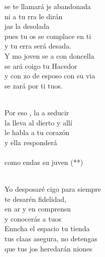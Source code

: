 \begin{cancion}%
	 se te llamará js abandonada \\
	ni a tu rra le dirán \\
	jas la desolada \\
	pues tu os se complace en ti \\
	y tu erra será desada.\\
	Y mo joven se a con doncella\\
	se ará coigo tu Hacedor\\
	y con zo de esposo con su via\\
	se zará por ti tuos. \\\jump\\
	\begin{chorus}%
	Por eso , la  a seducir\\
	la lleva al dierto y allí\\
	le habla a tu corazón \\
	y ella  responderá\\
{}\vspace*{-0.4cm}\\
	como endas  su juven (**)\\
	\end{chorus}%
	\jump\\
	Yo  desposaré cigo para siempre\\
	te desarén fidelidad,\\
	en ar y en comprensn \\
	y  conocerás a tuos\\
	Enncha el espacio tu tienda\\
	tus claas asegura, no  detengas\\
	que tus jos heredarán niones\\

\end{cancion}

